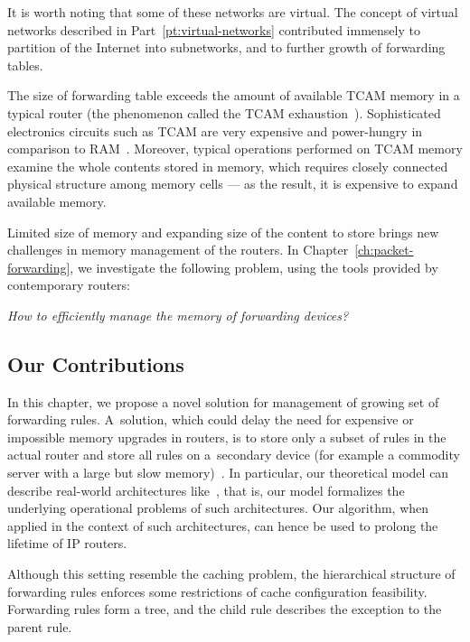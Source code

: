 It is worth noting that some of these networks are virtual.
The concept of virtual networks described in Part~\ref{pt:virtual-networks} contributed immensely to partition of the Internet into subnetworks, and to further growth of forwarding tables.

The size of forwarding table exceeds the amount of available TCAM memory in a typical router (the phenomenon called the TCAM exhaustion~\cite{tcam-exhaust}).
Sophisticated electronics circuits such as TCAM are very expensive and power-hungry in comparison to RAM~\cite{tcam-expensive}.
Moreover, typical operations performed on TCAM memory examine the whole contents stored in memory, which requires closely connected physical structure among memory cells --- as the result, it is expensive to expand available memory.

Limited size of memory and expanding size of the content to store brings new challenges in memory management of the routers.
In Chapter~\ref{ch:packet-forwarding}, we investigate the following problem, using the tools provided by contemporary routers:
\begin{center}
  \emph{How to efficiently manage the memory of forwarding devices?}
\end{center}

\subsection{Our Contributions}

In this chapter, we propose a novel solution for management of growing set of forwarding rules.
A~solution, which could delay
the need for expensive or impossible memory upgrades in routers, is to store
only a subset of rules in the actual router and store all rules on a~secondary
device (for example a commodity server with a large but slow
memory)~\cite{cacheflow,route-caching-flat,prefix-caching,fib-caching-non-overlapping,fibium-zipf}.
In particular, our
theoretical model can describe real-world architectures
like~\cite{cacheflow,fibium-zipf},
that is, our model formalizes the underlying operational
problems of such architectures. Our 
algorithm, when applied in the context of such architectures, can 
hence be used to prolong the lifetime of IP routers.


Although this setting resemble the caching problem, the hierarchical structure of forwarding rules enforces some restrictions of cache configuration feasibility.
Forwarding rules form a tree, and the child rule describes the exception to the parent rule.

